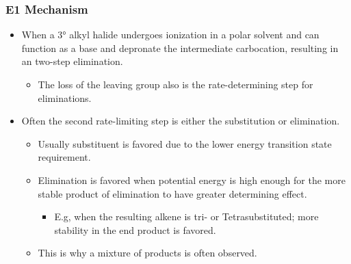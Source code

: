 \documentclass[12pt,a4paper]{article}
\begin{document}
    \subsubsection{E1 Mechanism}
    \begin{itemize}
        \item When a \ang{3} alkyl halide undergoes ionization in a polar solvent and can function as a {\color{o-Sun}base} and depronate the intermediate carbocation, resulting in an two-step elimination.
            \begin{itemize}
                \item The {\color{o-Sun}loss of the leaving group} also is the {\color{o-Sun}rate-determining} step for eliminations.
            \end{itemize}
        \item Often the second rate-limiting step is either the substitution or elimination.
            \begin{itemize}
                \item Usually substituent is favored due to the lower energy transition state requirement.
                \item Elimination is favored when potential energy is high enough for the more stable product of elimination to have greater determining effect.
                    \begin{itemize}
                        \item E.g, when the resulting alkene is tri- or Tetrasubstituted; more stability in the end product is favored.
                    \end{itemize}
                \item This is why a mixture of products is often observed.
            \end{itemize}
    \end{itemize}
\end{document}
